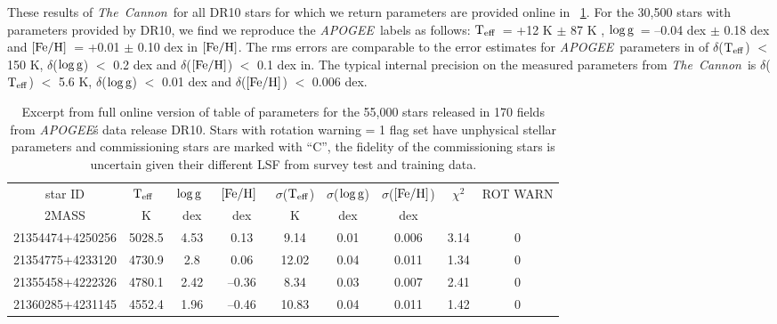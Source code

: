 \documentclass[12pt, preprint]{aastex}
\newcommand{\teff}{\mbox{$\rm T_{eff}$}}
\newcommand{\feh}{\mbox{$\rm [Fe/H]$}}
\newcommand{\logg}{\mbox{$\rm \log g$}}
\newcommand{\tc}{\textsl{The~Cannon}}
\newcommand{\apogee}{\textsl{APOGEE}}
\begin{document}
These results of \tc\ for all DR10 stars for which we return parameters are provided online in \tablename~\ref{tab:online}. 
For the 30,500 stars with parameters provided by DR10, we find we reproduce the \apogee\ labels as follows: 
\teff\ = +12 K $\pm$ 87 K , \logg\ = --0.04 dex $\pm$ 0.18 dex and \feh\ = +0.01 $\pm$ 0.10 dex in \feh. 
The rms errors are comparable to the error estimates for \apogee\ parameters in \citet{Meszaros2013} 
of $\delta$(\teff) $<$ 150 K, $\delta$(\logg) $<$ 0.2 dex and $\delta$(\feh) $<$ 0.1 dex in. 
The typical internal precision on the measured parameters from \tc\ is $\delta$(\teff) $<$ 5.6 K, $\delta$(\logg) $<$ 0.01 dex and $\delta$(\feh) $<$ 0.006 dex.

\begin{table}[!h]
\small{
\centering
\caption{Excerpt from full online version of table of parameters for the 55,000 stars released in 170 fields from \apogee\'s data release DR10. Stars with rotation warning = 1 flag set have unphysical stellar parameters and commissioning stars are marked with ``C'', the fidelity of the commissioning stars is uncertain given their different LSF from survey test and training data.} \begin{tabular}{| c | c | c |  c | c | c |  c | c | c |} %
\hline
star ID & \teff\ & \logg\ & \feh\ & $\sigma$(\teff) & $\sigma$(\logg) & $\sigma$(\feh) & $\chi^2$ & \tiny{ROT WARN}\\
{2MASS} &  K &  dex  & dex & K & dex & dex & & \\    
\hline
21354474+4250256 & 5028.5 & 4.53 & 0.13 & 9.14 & 0.01 & 0.006 & 3.14 & 0\\
21354775+4233120 & 4730.9 & 2.8 & 0.06 & 12.02 & 0.04 & 0.011 & 1.34 & 0\\
21355458+4222326 & 4780.1 & 2.42 & --0.36 & 8.34 & 0.03 & 0.007 & 2.41 & 0\\
21360285+4231145 &  4552.4 &  1.96 & --0.46  & 10.83 & 0.04 & 0.011 &  1.42 &  0\\
 \hline
\end{tabular}
\label{tab:online} }
\end{table}  
 
\end{document}
